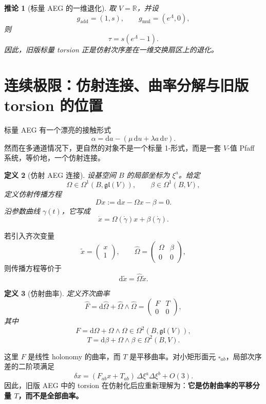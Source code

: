 \documentclass[11pt,a4paper]{ctexart}
\newtheorem{definition}{定义}[section]
\newtheorem{corollary}[definition]{推论}
\theoremstyle{remark}
\newcommand{\R}{\mathbb{R}}
\newcommand{\dd}{\mathrm{d}}
\begin{document}
\begin{corollary}[标量 AEG 的一维退化]
取 $V=\R$，并设
\[
g_{\mathrm{add}}=(1,s),\qquad g_{\mathrm{mul}}=(e^{\Lambda},0),
\]
则
\[
\tau=s(e^{\Lambda}-1).
\]
因此，旧版标量 torsion 正是仿射次序差在一维交换扇区上的退化。
\end{corollary}

\section{连续极限：仿射连接、曲率分解与旧版 torsion 的位置}

标量 AEG 有一个漂亮的接触形式
\[
\alpha=\dd a-(\mu\,\dd u+\lambda a\,\dd v).
\]
然而在多通道情况下，更自然的对象不是一个标量 1-形式，而是一套 $V$-值 Pfaff 系统，等价地，一个仿射连接。

\begin{definition}[仿射 AEG 连接]
设基空间 $B$ 的局部坐标为 $\xi^a$。给定
\[
\Omega\in\Omega^1(B,\mathfrak{gl}(V)),
\qquad
\beta\in\Omega^1(B,V),
\]
定义仿射传播方程
\[
Dx:=\dd x-\Omega x-\beta=0.
\]
沿参数曲线 $\gamma(t)$，它写成
\[
\dot x=\Omega(\dot\gamma)x+\beta(\dot\gamma).
\]
\end{definition}

若引入齐次变量
\[
\tilde x=
\begin{pmatrix}
x\\1
\end{pmatrix},
\qquad
\widehat\Omega=
\begin{pmatrix}
\Omega & \beta\\
0 & 0
\end{pmatrix},
\]
则传播方程等价于
\[
\dd\tilde x=\widehat\Omega\tilde x.
\]

\begin{definition}[仿射曲率]
定义齐次曲率
\[
\widehat F=\dd\widehat\Omega+\widehat\Omega\wedge\widehat\Omega
=
\begin{pmatrix}
F & T\\
0 & 0
\end{pmatrix},
\]
其中
\[
F=\dd\Omega+\Omega\wedge\Omega\in\Omega^2(B,\mathfrak{gl}(V)),
\]
\[
T=\dd\beta+\Omega\wedge\beta\in\Omega^2(B,V).
\]
\end{definition}

这里 $F$ 是线性 holonomy 的曲率，而 $T$ 是平移曲率。对小矩形面元 $\square_{ab}$，局部次序差的二阶项满足
\[
\delta x=(F_{ab}x+T_{ab})\,\Delta\xi^a\Delta\xi^b+O(3).
\]
因此，旧版 AEG 中的 torsion 在仿射化后应重新理解为：\textbf{它是仿射曲率的平移分量 $T$，而不是全部曲率。}
\end{document}
